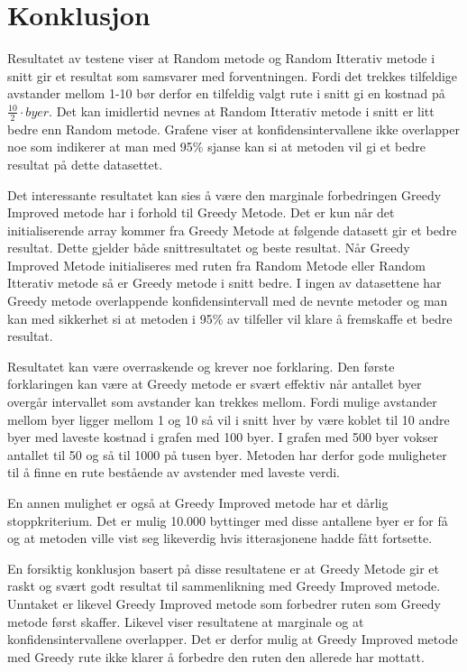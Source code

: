 \documentclass[12pt]{article}
\begin{document}
\section{Konklusjon}
Resultatet av testene viser at Random metode og Random Itterativ metode i snitt gir et resultat som samsvarer med forventningen. Fordi det trekkes tilfeldige avstander mellom 1-10 bør derfor en tilfeldig valgt rute i snitt gi en kostnad på $\frac{10}{2}\cdot byer$. Det kan imidlertid nevnes at Random Itterativ metode i snitt er litt bedre enn Random metode. Grafene viser at konfidensintervallene ikke overlapper noe som indikerer at man med 95\% sjanse kan si at metoden vil gi et bedre resultat på dette datasettet.

Det interessante resultatet kan sies å være den marginale forbedringen Greedy Improved metode har i forhold til Greedy Metode. Det er kun når det initialiserende array kommer fra Greedy Metode at følgende datasett gir et bedre resultat. Dette gjelder både snittresultatet og beste resultat. Når Greedy Improved Metode initialiseres med ruten fra Random Metode eller Random Itterativ metode så er Greedy metode i snitt bedre. I ingen av datasettene har Greedy metode overlappende konfidensintervall med de nevnte metoder og man kan med sikkerhet si at metoden i 95\% av tilfeller vil klare å fremskaffe et bedre resultat. 

Resultatet kan være overraskende og krever noe forklaring. Den første forklaringen kan være at Greedy metode er svært effektiv når antallet byer overgår intervallet som avstander kan trekkes mellom. Fordi mulige avstander mellom byer ligger mellom 1 og 10 så vil i snitt hver by være koblet til 10 andre byer med laveste kostnad i grafen med 100 byer. I grafen med 500 byer vokser antallet til 50 og så til 1000 på tusen byer. Metoden har derfor gode muligheter til å finne en rute bestående av avstender med laveste verdi. 

En annen mulighet er også at Greedy Improved metode har et dårlig stoppkriterium. Det er mulig 10.000 byttinger med disse antallene byer er for få og at metoden ville vist seg likeverdig hvis itterasjonene hadde fått fortsette.

En forsiktig konklusjon basert på disse resultatene er at Greedy Metode gir et raskt og svært godt resultat til sammenlikning med Greedy Improved metode. Unntaket er likevel Greedy Improved metode som forbedrer ruten som Greedy metode først skaffer. Likevel viser resultatene at marginale og at konfidensintervallene overlapper. Det er derfor mulig at Greedy Improved metode med Greedy rute ikke klarer å forbedre den ruten den allerede har mottatt. 

\newpage



\end{document}
